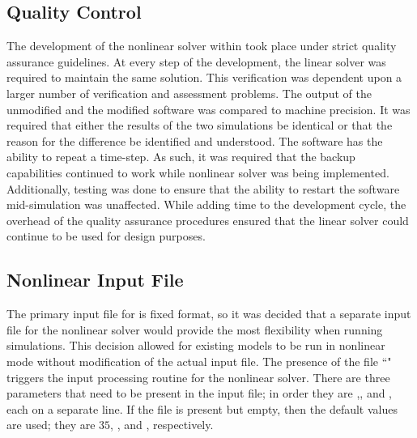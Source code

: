 \subsection{Quality Control}
\label{subsect:nlnDevelopment}
The development of the nonlinear solver within \cobra{} took place under strict quality assurance guidelines.
At every step of the development, the linear solver was required to maintain the same solution.
This verification was dependent upon a larger number of verification and assessment problems.
The output of the unmodified \cobra{} and the modified \cobra{} software was compared to machine precision.
It was required that either the results of the two simulations be identical or that the reason for the difference be identified and understood.
The \cobra{} software has the ability to repeat a time-step.
As such, it was required that the backup capabilities continued to work while nonlinear solver was being implemented.
Additionally, testing was done to ensure that the ability to restart the software mid-simulation was unaffected.
While adding time to the development cycle, the overhead of the quality assurance procedures ensured that the linear solver could continue to be used for design purposes.

\subsection{Nonlinear Input File}
\label{subsect:nlnCobraInputFile}
The primary input file for \cobra{} is fixed format, so it was decided that a separate input file for the nonlinear solver would provide the most flexibility when running simulations.
This decision allowed for existing models to be run in nonlinear mode without modification of the actual input file.
The presence of the file ``" triggers the input processing routine for the nonlinear solver.
There are three parameters that need to be present in the input file; in order they are \kmax{},\ftol{}, and \dtol{}, each on a separate line. 
If the file is present but empty, then the default values are used; they are $35$, , and , respectively.

